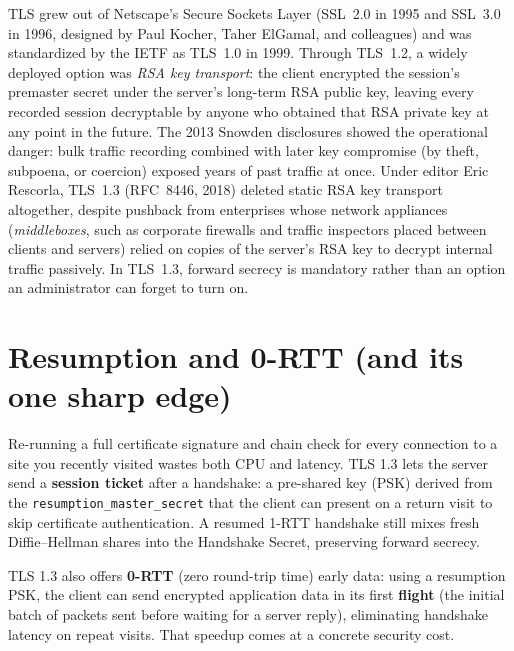 \begin{historybox}
TLS grew out of Netscape's Secure Sockets Layer (SSL~2.0 in 1995 and SSL~3.0 in
1996, designed by Paul Kocher, Taher ElGamal, and colleagues) and was standardized
by the IETF as TLS~1.0 in 1999. Through TLS~1.2, a widely deployed option was
\emph{RSA key transport}: the client encrypted the session's premaster secret under
the server's long-term RSA public key, leaving every recorded session decryptable by
anyone who obtained that RSA private key at any point in the future. The 2013
Snowden disclosures showed the operational danger: bulk traffic recording combined
with later key compromise (by theft, subpoena, or coercion) exposed years of past
traffic at once. Under editor Eric Rescorla, TLS~1.3 (RFC~8446, 2018) deleted static
RSA key transport altogether, despite pushback from enterprises whose network
appliances (\emph{middleboxes}, such as corporate firewalls and traffic inspectors
placed between clients and servers) relied on copies of the server's RSA key to
decrypt internal traffic passively. In TLS~1.3, forward secrecy is mandatory rather
than an option an administrator can forget to turn on.
\end{historybox}

\section{Resumption and 0-RTT (and its one sharp edge)}

Re-running a full certificate signature and chain check for every connection to a
site you recently visited wastes both CPU and latency. TLS 1.3 lets the server send
a \textbf{session ticket} after a handshake: a pre-shared key (PSK) derived from the
\texttt{resumption\_master\_secret} that the client can present on a return visit to
skip certificate authentication. A resumed 1-RTT handshake still mixes fresh
Diffie--Hellman shares into the Handshake Secret, preserving forward secrecy.

TLS 1.3 also offers \textbf{0-RTT} (zero round-trip time) early data: using a
resumption PSK, the client can send encrypted application data in its first
\textbf{flight} (the initial batch of packets sent before waiting for a server
reply), eliminating handshake latency on repeat visits. That speedup comes at a
concrete security cost.

